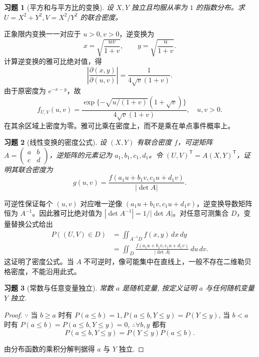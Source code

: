 \documentclass[12pt,fontset=fandol]{ctexart}
\newtheorem{exercise}{习题}[section]
\begin{document}
\begin{exercise}[平方和与平方比的变换]\label{q:Y4.34}
设 $X,Y$ 独立且均服从率为 $1$ 的指数分布。求 $U=X^2+Y^2,V=X^2/Y^2$ 的联合密度。\par{}
\end{exercise}

\begin{solve}\label{a:Y4.34}正象限内变换一一对应于 $u>0,v>0$，逆变换为\[x=\sqrt{\frac{uv}{1+v}},\qquad y=\sqrt{\frac{u}{1+v}}.\]计算逆变换的雅可比绝对值，得\[\left|\frac{\partial(x,y)}{\partial(u,v)}\right|=\frac{1}{4\sqrt v(1+v)}.\]由于原密度为 $e^{-x-y}$，故\[f_{U,V}(u,v)=\frac{\exp\{-\sqrt{u/(1+v)}(1+\sqrt v)\}}{4\sqrt v(1+v)},\quad u,v>0.\]在其余区域上密度为零。雅可比乘在密度上，而不是乘在单点事件概率上。\end{solve}

\begin{exercise}[线性变换的密度公式]\label{q:Y4.36}
设 $(X,Y)$ 有联合密度 $f$，可逆矩阵 $A=\begin{pmatrix}a&b\\c&d\end{pmatrix}$，逆矩阵的元素记为 $a_1,b_1,c_1,d_1$。令 $(U,V)^\mathsf T=A(X,Y)^\mathsf T$，证明其联合密度为\[g(u,v)=\frac{f(a_1u+b_1v,c_1u+d_1v)}{|\det A|}.\]\par{}
\end{exercise}

\begin{solve}\label{a:Y4.36}可逆性保证每个 $(u,v)$ 对应唯一逆像 $(a_1u+b_1v,c_1u+d_1v)$，逆变换导数矩阵恒为 $A^{-1}$。因此雅可比绝对值为 $|\det A^{-1}|=1/|\det A|$。对任意可测集合 $D$，变量替换公式给出\[\begin{aligned}P((U,V)\in D)&=\iint_{A^{-1}D}f(x,y)\,dx\,dy\\&=\iint_D\frac{f(a_1u+b_1v,c_1u+d_1v)}{|\det A|}\,du\,dv.\end{aligned}\]这证明了密度公式。当 $A$ 不可逆时，像可能集中在直线上，一般不存在二维勒贝格密度，不能沿用此式。\end{solve}

\begin{exercise}[常数与任意变量独立]\label{q:A4.4}
常数 $a$ 是随机变量, 按定义证明 $a$ 与任何随机变量 $Y$ 独立.\par{}
\end{exercise}

\begin{proof}\label{a:A4.4}
    $\because$ 当 $b\geq a$ 时有 $P(a\leq b)=1,P(a\leq b,Y\leq y)=P(Y\leq y)$, 当 $b<a$ 时有 $P(a\leq b)=P(a\leq b,Y\leq y)=0$, $\therefore\forall b,y$ 都有
    \[P(a\leq b,Y\leq y)=P(Y\leq y)P(a\leq b).\]

    由分布函数的乘积分解判据得 $a$ 与 $Y$ 独立.
\end{proof}
\end{document}
